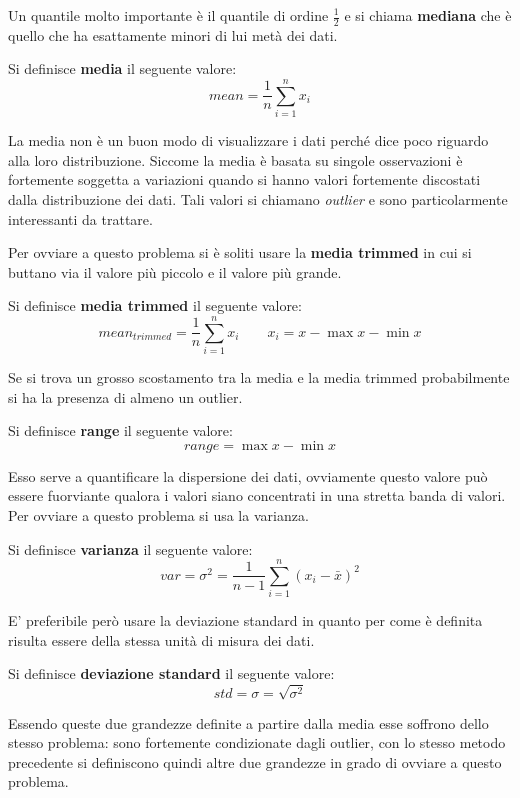 Un quantile molto importante è il quantile di ordine $\frac{1}{2}$ e si chiama \textbf{mediana} che è quello che ha esattamente minori di lui  metà dei dati.

\begin{defn}
	Si definisce \textbf{media} il seguente valore:
	\[mean = \frac{1}{n}\sum_{i=1}^{n}x_i\]
\end{defn}


La media non è un buon modo di visualizzare i dati perché dice poco riguardo alla loro distribuzione. Siccome la media è basata su singole osservazioni è fortemente soggetta a variazioni quando si hanno valori fortemente discostati dalla distribuzione dei dati.
Tali valori si chiamano \textit{outlier} e sono particolarmente interessanti da trattare.

Per ovviare a questo problema si è soliti usare  la \textbf{media trimmed} in cui si buttano via il valore più piccolo e il valore più grande. 
\begin{defn}
	Si definisce \textbf{media trimmed} il seguente valore:
	\[mean_{trimmed} = \frac{1}{n}\sum_{i=1}^{n}x_i  \qquad x_{i} = x - \max{x}- \min{x}\]
\end{defn}

Se si trova un grosso scostamento tra la media e la media trimmed probabilmente si ha la presenza di almeno un outlier.

\begin{defn}
	Si definisce \textbf{range} il seguente valore:
	\[ range = \max{x}- \min{x}\]
\end{defn}

Esso serve a quantificare la dispersione dei dati, ovviamente questo valore può essere fuorviante qualora i valori siano concentrati in una stretta banda di valori. Per ovviare a questo problema si usa la varianza.

\begin{defn}
	Si definisce \textbf{varianza} il seguente valore:
	\[ var =  \sigma^{2} =\frac{1}{n - 1 }\sum_{i = 1}^{n} (x_{i} - \bar{x})^{2}\]	
\end{defn}

E' preferibile però usare la deviazione standard in quanto per come è definita risulta essere della stessa unità di misura dei dati.
\begin{defn}
	Si definisce \textbf{deviazione standard} il seguente valore:
	\[ std = \sigma =  \sqrt{\sigma^{2}} \]
\end{defn}

Essendo queste due grandezze definite a partire dalla media esse soffrono dello stesso problema: sono fortemente condizionate dagli outlier, con lo stesso metodo precedente si definiscono quindi altre due grandezze in grado di ovviare a questo problema.

